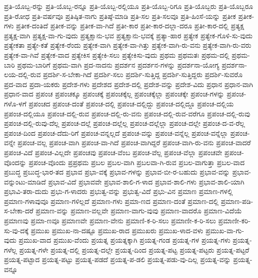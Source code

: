 {ಪ್ರತಿ-ಯೊಬ್ಬ-ರನ್ನು
ಪ್ರತಿ-ಯೊಬ್ಬ-ರನ್ನೂ
ಪ್ರತಿ-ಯೊಬ್ಬ-ರಲ್ಲಿಯೂ
ಪ್ರತಿ-ಯೊಬ್ಬ-ರಿಗೂ
ಪ್ರತಿ-ಯೊಬ್ಬರು
ಪ್ರತಿ-ಯೊಬ್ಬರೂ
ಪ್ರತಿ-ರೋಧ
ಪ್ರತಿ-ವರ್ಷವೂ
ಪ್ರತಿಷ್ಠಿತ-ನಾಗು
ಪ್ರತಿಷ್ಠೆ-ಮಾಡಿ
ಪ್ರತಿ-ಸಲ
ಪ್ರತಿ-ಸಲವೂ
ಪ್ರತಿ-ಹಿಂಸೆ-ಯನ್ನು
ಪ್ರತೀಕ
ಪ್ರತೀಕ-ಗಳು
ಪ್ರತೀಕ-ದಂತಿದೆ
ಪ್ರತೀಕ-ವನ್ನು
ಪ್ರತೀಕ-ವಾ-ಗಿದೆ
ಪ್ರತೀ-ಕಾರ
ಪ್ರತೀ-ಕಾರ-ದಲ್ಲಾ-ದರೂ
ಪ್ರತೀ-ಕಾರ-ದಲ್ಲಿ
ಪ್ರತ್ಯಕ್ಷ
ಪ್ರತ್ಯಕ್ಷ-ವಾಗಿ
ಪ್ರತ್ಯಕ್ಷ-ವಾ-ಗು-ವುದು
ಪ್ರತ್ಯಕ್ಷಾನು-ಭವ
ಪ್ರತ್ಯಕ್ಷಾನು-ಭವಕ್ಕೆ
ಪ್ರತ್ಯಾ-ಹಾರ
ಪ್ರತ್ಯೇಕ
ಪ್ರತ್ಯೇಕ-ಗೊಳಿ-ಸು-ವುದು
ಪ್ರತ್ಯೇಕತಾ
ಪ್ರತ್ಯೇ-ಕತೆ
ಪ್ರತ್ಯೇಕ-ರೆಂದು
ಪ್ರತ್ಯೇಕ-ವಾಗಿ
ಪ್ರತ್ಯೇಕ-ವಾ-ಗಿತ್ತು
ಪ್ರತ್ಯೇಕ-ವಾಗಿ-ರು-ವನು
ಪ್ರತ್ಯೇಕ-ವಾಗಿ-ರು-ವರು
ಪ್ರತ್ಯೇಕ-ವಾ-ಗಿವೆ
ಪ್ರತ್ಯೇಕ-ವಾದ
ಪ್ರತ್ಯೇಕಿಸ
ಪ್ರತ್ಯೇಕಿ-ಸಲು
ಪ್ರತ್ಯೇಕಿಸು-ವುದು
ಪ್ರಥಮ
ಪ್ರಥಮತಃ
ಪ್ರಥಮ-ದಲ್ಲಿ
ಪ್ರಥಮ-ಬಾರಿ
ಪ್ರಥಮ-ಬಾರಿಗೆ
ಪ್ರಥಮ-ವಾಗಿ
ಪ್ರದ-ನಾದನು
ಪ್ರದರ್ಶನ
ಪ್ರದರ್ಶನ-ಗಳನ್ನು
ಪ್ರದರ್ಶನಾ-ಯೋಗ್ಯ
ಪ್ರದರ್ಶನಾ-ಲಯ-ದಲ್ಲಿ-ರುವ
ಪ್ರದರ್ಶಿ-ಸ-ಬೇಕಾ-ಗಿದೆ
ಪ್ರದರ್ಶಿ-ಸಲು
ಪ್ರದರ್ಶಿ-ಸುತ್ತಿದ್ದ
ಪ್ರದರ್ಶಿ-ಸುತ್ತಿದ್ದರು
ಪ್ರದರ್ಶಿ-ಸುವರೊ
ಪ್ರದ-ವಾದ
ಪ್ರದಾ-ಯಕರು
ಪ್ರದೇಶ-ಗಳು
ಪ್ರದೇಶದ
ಪ್ರದೇಶ-ದಲ್ಲಿ
ಪ್ರದೇಶ-ವನ್ನು
ಪ್ರದೇಶ-ವಿದು
ಪ್ರಧಾನ
ಪ್ರಧಾನ-ವಾಗಿ
ಪ್ರಧಾನ-ವಾದ
ಪ್ರಪಂಚ
ಪ್ರಪಂಚಕ್ಕೂ
ಪ್ರಪಂಚಕ್ಕೆ
ಪ್ರಪಂಚಕ್ಕೆಲ್ಲ
ಪ್ರಪಂಚಕ್ಕೆಲ್ಲಾ
ಪ್ರಪಂಚಕ್ಕೇ
ಪ್ರಪಂಚ-ಗಳನ್ನು
ಪ್ರಪಂಚ-ಗಳೊ-ಳಗೆ
ಪ್ರಪಂಚದ
ಪ್ರಪಂಚ-ದಂತೆ
ಪ್ರಪಂಚ-ದಲ್ಲಿ
ಪ್ರಪಂಚ-ದಲ್ಲಿದ್ದು
ಪ್ರಪಂಚ-ದಲ್ಲಿದ್ದೂ
ಪ್ರಪಂಚ-ದಲ್ಲಿಯ
ಪ್ರಪಂಚ-ದಲ್ಲಿಯೂ
ಪ್ರಪಂಚ-ದಲ್ಲಿ-ರುವ
ಪ್ರಪಂಚ-ದಲ್ಲಿ-ರು-ವನು
ಪ್ರಪಂಚ-ದಲ್ಲಿ-ರುವ-ವರೆಗೂ
ಪ್ರಪಂಚ-ದಲ್ಲಿ-ರುವು
ಪ್ರಪಂಚ-ದಲ್ಲಿ-ರುವು-ದೆಲ್ಲ
ಪ್ರಪಂಚ-ದಲ್ಲೆ
ಪ್ರಪಂಚ-ದಲ್ಲೆಲ್ಲ
ಪ್ರಪಂಚ-ದಲ್ಲೆಲ್ಲಾ
ಪ್ರಪಂಚ-ದಲ್ಲೇ
ಪ್ರಪಂಚ-ದ-ವ-ರೆಲ್ಲ
ಪ್ರಪಂಚ-ದಿಂದ
ಪ್ರಪಂಚ-ದೆದು-ರಿಗೆ
ಪ್ರಪಂಚ-ವನ್ನಲ್ಲದೆ
ಪ್ರಪಂಚ-ವನ್ನು
ಪ್ರಪಂಚ-ವನ್ನೆಲ್ಲ
ಪ್ರಪಂಚ-ವನ್ನೆಲ್ಲಾ
ಪ್ರಪಂಚ-ವನ್ನೇ
ಪ್ರಪಂಚ-ವಲ್ಲ
ಪ್ರಪಂಚ-ವಾಗಿ
ಪ್ರಪಂಚ-ವಾ-ಗಿದೆ
ಪ್ರಪಂಚ-ವಾಗಿದ್ದರೆ
ಪ್ರಪಂಚ-ವಾಗಿ-ರು-ವನು
ಪ್ರಪಂಚ-ವಾದರೆ
ಪ್ರಪಂಚ-ವಿದೆ
ಪ್ರಪಂಚ-ವಿಲ್ಲದೇ
ಪ್ರಪಂಚವು
ಪ್ರಪಂಚ-ವೆಂಬ
ಪ್ರಪಂಚ-ವೆಲ್ಲ
ಪ್ರಪಂಚ-ವೆಲ್ಲಾ
ಪ್ರಪಂಚವೇ
ಪ್ರಪಂಚ-ವೊಂದನ್ನು
ಪ್ರಪಂಚ-ವೊಂದು
ಪ್ರಪ್ರಥಮ
ಪ್ರಬಲ
ಪ್ರಬಲ-ವಾಗಿ
ಪ್ರಬಲವಾ-ಗಿ-ರುವ
ಪ್ರಬಲ-ವಾಗುತ್ತಾ
ಪ್ರಬಲ-ವಾದ
ಪ್ರಬುದ್ಧ
ಪ್ರಬುದ್ಧ-ಭಾರ-ತದ
ಪ್ರಭಾವ
ಪ್ರಭಾ-ವಕ್ಕೆ
ಪ್ರಭಾವ-ಗಳನ್ನು
ಪ್ರಭಾವ-ಬೀ-ರ-ಬಹುದು
ಪ್ರಭಾವ-ವನ್ನು
ಪ್ರಭಾವ-ವನ್ನುಂಟು-ಮಾಡಿದೆ
ಪ್ರಭಾವ-ವಿದೆ
ಪ್ರಭಾವವೇ
ಪ್ರಭಾವ-ಶಾಲಿ-ಗ-ಳಾದ
ಪ್ರಭಾವ-ಶಾಲಿ-ಗಳು
ಪ್ರಭಾವ-ಶಾಲಿ-ಯಾಗಿ
ಪ್ರಭಾವಿ-ತರಾ-ದುದು
ಪ್ರಭು-ಗ-ಳಾದರು
ಪ್ರಭುತ್ವ-ವನ್ನು
ಪ್ರಭುತ್ವ-ವಿದೆ
ಪ್ರಭು-ವಿನ
ಪ್ರಮಾಣ
ಪ್ರಮಾಣ-ಗಳಲ್ಲಿ
ಪ್ರಮಾಣ-ಗಳಾವುವೂ
ಪ್ರಮಾಣ-ಗಳಿಲ್ಲದೆ
ಪ್ರಮಾಣ-ಗಳು
ಪ್ರಮಾ-ಣದ
ಪ್ರಮಾಣ-ದಂತೆ
ಪ್ರಮಾಣ-ದಲ್ಲಿ
ಪ್ರಮಾಣ-ಪಡಿ-ಸ-ಬೇಕಾ-ದರೆ
ಪ್ರಮಾಣ-ವನ್ನು
ಪ್ರಮಾಣ-ವಲ್ಲವೇ
ಪ್ರಮಾಣ-ವಾಗು-ವುವು
ಪ್ರಮಾಣ-ವಾದರೊ
ಪ್ರಮಾಣ-ವಿದೆಯೆ
ಪ್ರಮಾಣವು
ಪ್ರಮಾ-ಣವೂ
ಪ್ರಮಾಣವೇ
ಪ್ರಮಾಣ-ವೇನು
ಪ್ರಮಾಣಿ-ಕ-ರಿ-ಸಲು
ಪ್ರಮಾಣೀ-ಕ-ರಿ-ಸಲು
ಪ್ರಮಾಣೀ-ಕರಿ-ಸು-ವು-ದಕ್ಕೆ
ಪ್ರಮುಖ
ಪ್ರಮುಖ-ನಾ-ದಷ್ಟೂ
ಪ್ರಮುಖ-ರಾದ
ಪ್ರಮುಖರು
ಪ್ರಮುಖ-ಳಾದ-ವಳು
ಪ್ರಮುಖ-ವಾ-ಗು-ವುದು
ಪ್ರಮುಖ-ವಾದ
ಪ್ರಮುಖ-ವೆಂದು
ಪ್ರಯತ್ನ
ಪ್ರಯತ್ನಕ್ಕಾಗಿ
ಪ್ರಯತ್ನ-ಗಂಡ
ಪ್ರಯತ್ನ-ಗಳ
ಪ್ರಯತ್ನ-ಗಳು
ಪ್ರಯತ್ನ-ಗಳೆಲ್ಲ
ಪ್ರಯತ್ನ-ಗಳೇ
ಪ್ರಯತ್ನ-ದಲ್ಲಿ
ಪ್ರಯತ್ನ-ದಲ್ಲೇ
ಪ್ರಯತ್ನ-ದಿಂದ
ಪ್ರಯತ್ನ-ಪಟ್ಟ
ಪ್ರಯತ್ನ-ಪಟ್ಟರು
ಪ್ರಯತ್ನ-ಪಟ್ಟರೆ
ಪ್ರಯತ್ನ-ಪಟ್ಟಾದ
ಪ್ರಯತ್ನ-ಪಟ್ಟು
ಪ್ರಯತ್ನ-ಪಡದೆ
ಪ್ರಯತ್ನ-ಪ-ಡಲಿ
ಪ್ರಯತ್ನ-ಪಡು-ವು-ದಿಲ್ಲ
ಪ್ರಯತ್ನ-ವನ್ನು
ಪ್ರಯತ್ನ-ವನ್ನೂ
}

